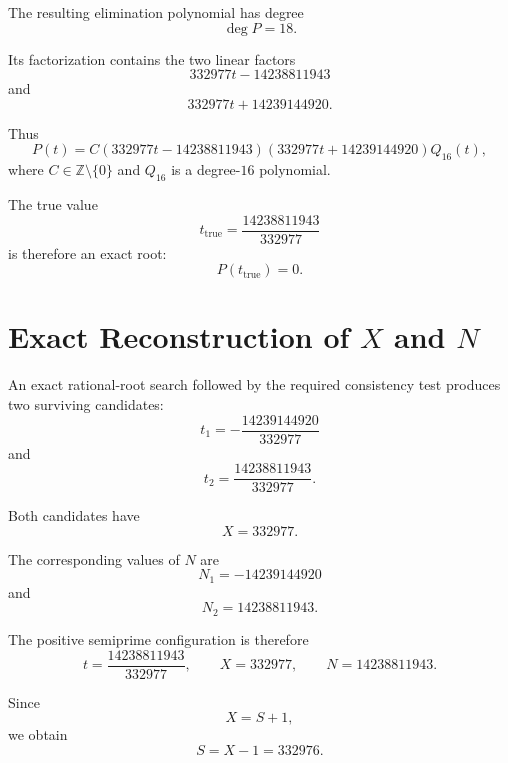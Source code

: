 \documentclass[11pt,a4paper]{article}
\theoremstyle{definition}
\theoremstyle{remark}
\newcommand{\ZZ}{\mathbb{Z}}
\begin{document}
The resulting elimination polynomial has degree
\[
\deg P=18.
\]

Its factorization contains the two linear factors
\begin{equation}
332977t-14238811943
\end{equation}
and
\begin{equation}
332977t+14239144920.
\end{equation}

Thus
\begin{equation}
P(t)
=
C
(332977t-14238811943)
(332977t+14239144920)
Q_{16}(t),
\end{equation}
where $C\in\ZZ\setminus\{0\}$ and $Q_{16}$ is a degree-$16$ polynomial.

The true value
\begin{equation}
t_{\mathrm{true}}
=
\frac{14238811943}{332977}
\end{equation}
is therefore an exact root:
\begin{equation}
P(t_{\mathrm{true}})=0.
\end{equation}

\section{Exact Reconstruction of $X$ and $N$}

An exact rational-root search followed by the required consistency test
produces two surviving candidates:
\begin{equation}
t_1=-\frac{14239144920}{332977}
\end{equation}
and
\begin{equation}
t_2=\frac{14238811943}{332977}.
\end{equation}

Both candidates have
\[
X=332977.
\]

The corresponding values of $N$ are
\[
N_1=-14239144920
\]
and
\[
N_2=14238811943.
\]

The positive semiprime configuration is therefore
\begin{equation}
\boxed{
t=\frac{14238811943}{332977},
\qquad
X=332977,
\qquad
N=14238811943.
}
\end{equation}

Since
\[
X=S+1,
\]
we obtain
\begin{equation}
\boxed{
S=X-1=332976.
}
\end{equation}
\end{document}
